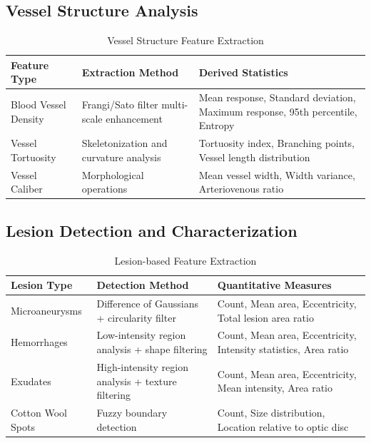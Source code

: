 \documentclass[11pt]{article}
\begin{document}
\subsection{Vessel Structure Analysis}
\begin{table}[h!]
\centering
\begin{tabular}{p{}p{}p{}}
\toprule
\textbf{Feature Type} & \textbf{Extraction Method} & \textbf{Derived Statistics} \\
\midrule
Blood Vessel Density & Frangi/Sato filter multi-scale enhancement & Mean response, Standard deviation, Maximum response, 95th percentile, Entropy \\
Vessel Tortuosity & Skeletonization and curvature analysis & Tortuosity index, Branching points, Vessel length distribution \\
Vessel Caliber & Morphological operations & Mean vessel width, Width variance, Arteriovenous ratio \\
\bottomrule
\end{tabular}
\caption{Vessel Structure Feature Extraction}
\end{table}

\subsection{Lesion Detection and Characterization}
\begin{table}[h!]
\centering
\begin{tabular}{p{}p{}p{}}
\toprule
\textbf{Lesion Type} & \textbf{Detection Method} & \textbf{Quantitative Measures} \\
\midrule
Microaneurysms & Difference of Gaussians + circularity filter & Count, Mean area, Eccentricity, Total lesion area ratio \\
Hemorrhages & Low-intensity region analysis + shape filtering & Count, Mean area, Eccentricity, Intensity statistics, Area ratio \\
Exudates & High-intensity region analysis + texture filtering & Count, Mean area, Eccentricity, Mean intensity, Area ratio \\
Cotton Wool Spots & Fuzzy boundary detection & Count, Size distribution, Location relative to optic disc \\
\bottomrule
\end{tabular}
\caption{Lesion-based Feature Extraction}
\end{table}
\end{document}

